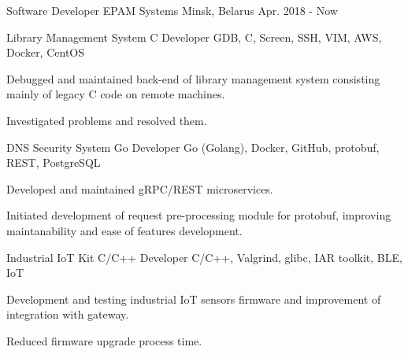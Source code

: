 

\begin{cventries}
\cventry
    {Software Developer} %
    {EPAM Systems} %
    {Minsk, Belarus} %
    {Apr. 2018 - Now} %
    {%
        \cvproject
            {Library Management System} %
            {C Developer} %
            {GDB, C, Screen, SSH, VIM, AWS, Docker, CentOS}%
            {
                \begin{cvitems}
                    \item {Debugged and maintained back-end of library management
                    system consisting mainly of legacy C code on remote machines. }
                    \item { Investigated problems and resolved them.}
                \end{cvitems}    
           }
        \cvproject
            {DNS Security System} %
            {Go Developer} %
            {Go (Golang), Docker, GitHub, protobuf, REST, PostgreSQL}%
            {
                \begin{cvitems}
                    \item {Developed and maintained gRPC/REST microservices.}
                    \item {Initiated development of request pre-processing module for protobuf, improving maintanability and 
                    ease of features development.}
                \end{cvitems}  
            }
        \cvproject
            {Industrial IoT Kit} %
            {C/C++ Developer} %
            {C/C++, Valgrind, glibc, IAR toolkit, BLE, IoT}%
            {
                \begin{cvitems}
                    \item {Development and testing industrial IoT sensors firmware and
                        improvement of integration with gateway.}
                    \item {Reduced firmware upgrade process time.}
                \end{cvitems} 
            }
    }


\end{cventries}
